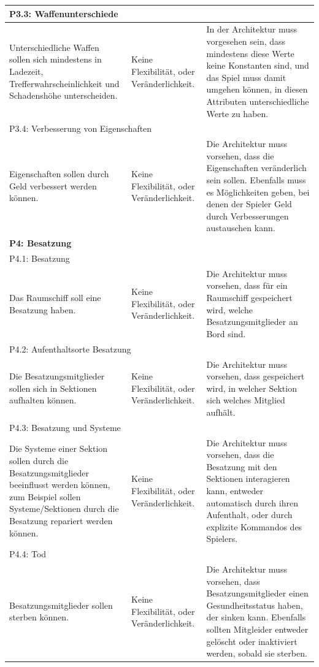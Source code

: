\documentclass[fontsize=12pt,paper=a4,twoside]{scrartcl}
\begin{document}
\begin{longtable}[c]{|p{5cm}|p{5cm}|p{5cm}|}
\\ \hline
\multicolumn{3}{|l|}{{P3.3: Waffenunterschiede}} 
\\ \hline
Unterschiedliche Waffen sollen sich mindestens in Ladezeit, Trefferwahrscheinlichkeit und Schadenshöhe unterscheiden. & Keine Flexibilität, oder Veränderlichkeit.    &  In der Architektur muss vorgesehen sein, dass mindestens diese Werte keine Konstanten sind, und das Spiel muss damit umgehen können, in diesen Attributen unterschiedliche Werte zu haben. 
\\ \hline
\multicolumn{3}{|l|}{{P3.4: Verbesserung von Eigenschaften}} 
\\ \hline
Eigenschaften sollen durch Geld verbessert werden können. & Keine Flexibilität, oder Veränderlichkeit.    & Die Architektur muss vorsehen, dass die Eigenschaften veränderlich sein sollen. Ebenfalls muss es Möglichkeiten geben, bei denen der Spieler Geld durch Verbesserungen austauschen kann.  
\\ \hline
%
\multicolumn{3}{|l|}{{\textbf{P4: Besatzung}}} 
\\ \hline
\multicolumn{3}{|l|}{{P4.1: Besatzung}} 
\\ \hline
Das Raumschiff soll eine Besatzung haben. & Keine Flexibilität, oder Veränderlichkeit.    &  Die Architektur muss vorsehen, dass für ein Raumschiff gespeichert wird, welche Besatzungsmitglieder an Bord sind. 
\\ \hline  
\multicolumn{3}{|l|}{{P4.2: Aufenthaltsorte Besatzung}} 
\\ \hline
Die Besatzungsmitglieder sollen sich in Sektionen aufhalten können. & Keine Flexibilität, oder Veränderlichkeit.    &  Die Architektur muss vorsehen, dass gespeichert wird, in welcher Sektion sich welches Mitglied aufhält. 
\\ \hline                                                  
\multicolumn{3}{|l|}{{P4.3: Besatzung und Systeme}} 
\\ \hline
Die Systeme einer Sektion sollen durch die Besatzungsmitglieder beeinflusst werden können, zum Beispiel sollen Systeme/Sektionen durch die Besatzung repariert werden können. & Keine Flexibilität, oder Veränderlichkeit.    &  Die Architektur muss vorsehen, dass die Besatzung mit den Sektionen interagieren kann, entweder automatisch durch ihren Aufenthalt, oder durch explizite Kommandos des Spielers. 
\\ \hline
\multicolumn{3}{|l|}{{P4.4: Tod}} 
\\ \hline
Besatzungsmitglieder sollen sterben können. & Keine Flexibilität, oder Veränderlichkeit.    & Die Architektur muss vorsehen, dass Besatzungsmitglieder einen Gesundheitsstatus haben, der sinken kann. Ebenfalls sollten Mitgleider entweder gelöscht oder inaktiviert werden, sobald sie sterben. 

\end{longtable}
\end{document}
